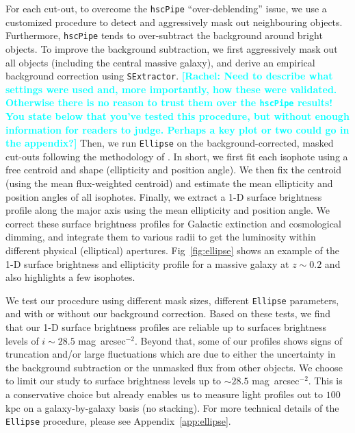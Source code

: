 \documentclass[a4paper,fleqn,usenatbib]{mnras}
\def\sb{mag~arcsec$^{-2}$}
\newcommand{\rachel}[1]{\textcolor{cyan}{\textbf{[Rachel: #1]}}}
\begin{document}
    For each cut-out, to overcome the \texttt{hscPipe} ``over-deblending'' issue, 
    we use a customized procedure to detect and aggressively mask out
    neighbouring objects. 
    Furthermore, \texttt{hscPipe} tends to over-subtract the background around 
    bright objects. 
    To improve the background subtraction, we first aggressively mask 
    out all objects (including the central massive galaxy), and derive an 
    empirical background correction using \texttt{SExtractor}.
\rachel{Need to describe what settings were used and, more importantly, how these were validated.  Otherwise there is no reason to trust them over the \texttt{hscPipe} results!  You state below that you've tested this procedure, but without enough information for readers to judge.  Perhaps a key plot or two could go in the appendix?}
Then, we run \texttt{Ellipse} on the background-corrected, masked cut-outs 
    following the methodology of \citet{Li2012}. 
    In short, we first fit each isophote using a free centroid and shape 
    (ellipticity and position angle). 
    We then fix the centroid (using the mean flux-weighted centroid) and estimate
    the mean ellipticity and position angles of all isophotes. 
    Finally, we extract a 1-D surface brightness profile along the major axis using 
    the mean ellipticity and position angle. 
    We correct these surface brightness profiles for Galactic extinction and 
    cosmological dimming, and integrate them to various radii to get the luminosity 
    within different physical (elliptical) apertures. 
    Fig~\ref{fig:ellipse} shows an example of the 1-D surface brightness and 
    ellipticity profile for a massive galaxy at $z{\sim}0.2$ and also highlights 
    a few isophotes.    

    We test our procedure using different mask sizes, different \texttt{Ellipse} 
    parameters, and with or without our background correction. 
    Based on these tests, we find that our 1-D surface brightness profiles are reliable 
    up to surfaces brightness levels of $i{\sim}28.5$ \sb. 
    Beyond that, some of our profiles shows signs of truncation and/or large 
    fluctuations which are due to either the uncertainty in the background 
    subtraction or the unmasked flux from other objects.
    We choose to limit our study to surface brightness levels up to ${\sim} 28.5$ \sb. 
    This is a conservative choice but already enables us to measure light profiles 
    out to $100$ kpc on a galaxy-by-galaxy basis (no stacking). 
    For more technical details of the \texttt{Ellipse} procedure, please see 
    Appendix~\ref{app:ellipse}.
\end{document}
